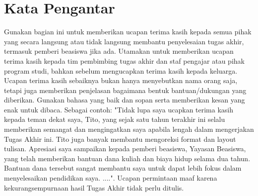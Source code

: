 %
%
%
%
%

\chapter*{Kata Pengantar}

Gunakan bagian ini untuk memberikan ucapan terima kasih kepada semua pihak yang secara 
langsung atau tidak langsung membantu penyelesaian tugas akhir, termasuk pemberi beasiswa jika ada. 
Utamakan untuk memberikan ucapan terima kasih kepada tim pembimbing tugas akhir dan staf pengajar atau pihak program studi, bahkan sebelum mengucapkan terima kasih kepada keluarga. Ucapan terima kasih sebaiknya bukan hanya menyebutkan nama orang saja, tetapi juga memberikan penjelasan bagaimana bentuk bantuan/dukungan yang diberikan. Gunakan bahasa yang baik dan sopan serta memberikan kesan yang enak untuk dibaca. Sebagai contoh: "Tidak lupa saya ucapkan terima kasih kepada teman dekat saya, Tito, yang sejak satu tahun terakhir ini selalu memberikan semangat dan mengingatkan saya apabila lengah dalam mengerjakan Tugas Akhir ini. Tito juga banyak membantu mengoreksi format dan layout tulisan. Apresiasi saya sampaikan kepada pemberi beasiswa, Yayasan Beasiswa, yang telah memberikan bantuan dana kuliah dan biaya hidup selama dua tahun. Bantuan dana tersebut sangat membantu saya untuk dapat lebih fokus dalam menyelesaikan pendidikan saya. ....". Ucapan permintaan maaf karena kekurangsempurnaan hasil Tugas Akhir tidak perlu ditulis.

\blindtext
